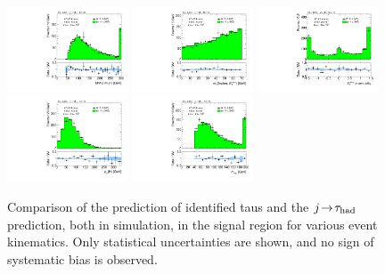 \begin{figure}[tp]
  \includegraphics[width=0.32\textwidth]{figures/analysis/vbf-MCXSR/mMMC}
  \includegraphics[width=0.32\textwidth]{figures/analysis/vbf-MCXSR/mT}
  \includegraphics[width=0.32\textwidth]{figures/analysis/vbf-MCXSR/met-phi-centrality}
  \includegraphics[width=0.32\textwidth]{figures/analysis/vbf-MCXSR/H-pt-hi}
  \includegraphics[width=0.32\textwidth]{figures/analysis/vbf-MCXSR/mvis}
  \caption{Comparison of the prediction of identified taus and the $j\!\rightarrow\!\tau_\text{had}$ prediction, both in simulation, in the signal region for various event kinematics. Only statistical uncertainties are shown, and no sign of systematic bias is observed.}
  \label{fig:backgrounds-MCXSR-taus}
\end{figure}

\clearpage


